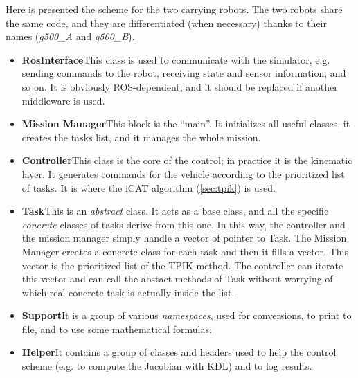 Here is presented the scheme for the two carrying robots. The two robots share the same code, and they are differentiated (when necessary) thanks to their names (\textit{g500\_A} and \textit{g500\_B}).

\begin{itemize}
	\item \textbf{RosInterface}\quad This class is used to communicate with the simulator, e.g. sending commands to the robot, receiving state and sensor information, and so on. It is obviously ROS-dependent, and it should be replaced if another middleware is used.
	
	\item \textbf{Mission Manager}\quad This block is the \enquote{main}. It initializes all useful classes, it creates the tasks list, and it manages the whole mission.
	
	\item \textbf{Controller}\quad This class is the core of the control; in practice it is the kinematic layer. It generates commands for the vehicle according to the prioritized list of tasks. It is where the iCAT algorithm (\ref{sec:tpik}) is used.
	
	\item \textbf{Task}\quad This is an \textit{abstract} class. It acts as a base class, and all the specific \textit{concrete} classes of tasks derive from this one. In this way, the controller and the mission manager simply handle a vector of pointer to Task. The Mission Manager creates a concrete class for each task and then it fills a vector. This vector is the prioritized list of the TPIK method. The controller can iterate this vector and can call the abstact methods of Task without worrying of which real concrete task is actually inside the list.
	
	\item \textbf{Support}\quad It is a group of various \textit{namespaces}, used for conversions, to print to file, and to use some mathematical formulas.
	
	\item \textbf{Helper}\quad It contains a group of classes and headers used to help the control scheme (e.g. to compute the Jacobian with KDL) and to log results.
\end{itemize}


